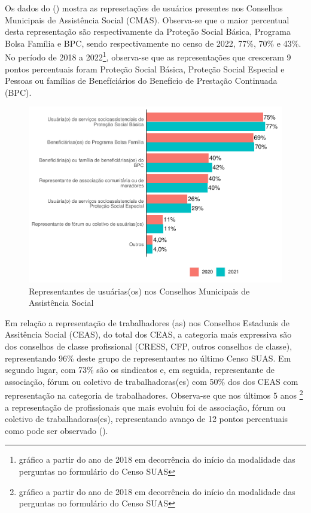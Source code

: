 \documentclass[
  brazilian]{report}
\begin{document}
Os dados do () mostra as represetações de usuários
presentes nos Conselhos Municipais de Assistência Social (CMAS).
Observa-se que o maior percentual desta representação são
respectivamente da Proteção Social Básica, Programa Bolsa Família e BPC,
sendo respectivamente no censo de 2022, 77\%, 70\% e 43\%. No período de
2018 a
2022\footnote{gráfico a partir do ano de 2018 em decorrência do início da modalidade das perguntas no formulário do Censo SUAS},
observa-se que as representações que cresceram 9 pontos percentuais
foram Proteção Social Básica, Proteção Social Especial e Pessoas ou
famílias de Benefíciários do Benefício de Prestação Continuada (BPC).

\begin{figure}
\includegraphics{Censo-SUAS-2022_files/figure-latex/usu_cmun-1} \caption[Representantes de usuárias(os) nos Conselhos Municipais de Assistência Social]{Representantes de usuárias(os) nos Conselhos Municipais de Assistência Social}\label{fig:usu_cmun}
\end{figure}

Em relação a representação de trabalhadores (as) nos Conselhos Estaduais
de Assitência Social (CEAS), do total dos CEAS, a categoria mais
expressiva são dos conselhos de classe profissional (CRESS, CFP, outros
conselhos de classe), representando 96\% deste grupo de representantes
no último Censo SUAS. Em segundo lugar, com 73\% são os sindicatos e, em
seguida, representante de associação, fórum ou coletivo de
trabalhadoras(es) com 50\% dos dos CEAS com representação na categoria
de trabalhadores. Observa-se que nos últimos 5 anos
\footnote{gráfico a partir do ano de 2018 em decorrência do início da modalidade das perguntas no formulário do Censo SUAS}
a representação de profissionais que mais evoluiu foi de associação,
fórum ou coletivo de trabalhadoras(es), representando avanço de 12
pontos percentuais como pode ser observado ().
\end{document}
